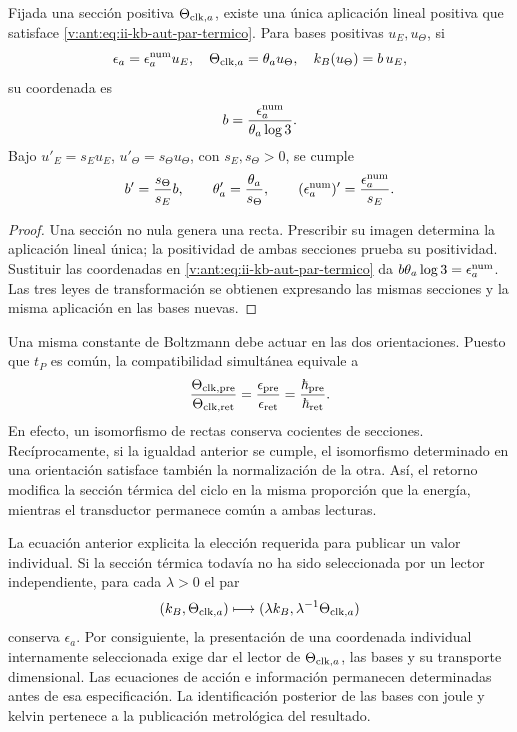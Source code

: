 \begin{theorem}
Fijada una sección positiva \(\Theta_{{\rm clk},a}\), existe una
única aplicación lineal positiva que satisface
\eqref{v:ant:eq:ii-kb-aut-par-termico}. Para bases positivas \(u_E,u_\Theta\),
si
\[
 \epsilon_a=\epsilon_a^{\rm num}u_E,\quad
 \Theta_{{\rm clk},a}=\theta_a u_\Theta,\quad
 k_B(u_\Theta)=b\,u_E,
\]
su coordenada es
\begin{equation}
 b=\frac{\epsilon_a^{\rm num}}{\theta_a\log3}.
 \label{v:ant:eq:ii-kb-aut-coordenada}
\end{equation}
Bajo \(u'_E=s_Eu_E\), \(u'_\Theta=s_\Theta u_\Theta\), con
\(s_E,s_\Theta>0\), se cumple
\[
 b'=\frac{s_\Theta}{s_E}b,\qquad
 \theta'_a=\frac{\theta_a}{s_\Theta},\qquad
 (\epsilon_a^{\rm num})'=\frac{\epsilon_a^{\rm num}}{s_E}.
\]
\end{theorem}
\begin{proof}
Una sección no nula genera una recta. Prescribir su imagen determina
la aplicación lineal única; la positividad de ambas secciones prueba
su positividad. Sustituir las coordenadas en
\eqref{v:ant:eq:ii-kb-aut-par-termico} da
\(b\theta_a\log3=\epsilon_a^{\rm num}\). Las tres leyes de
transformación se obtienen expresando las mismas secciones y la misma
aplicación en las bases nuevas.
\end{proof}

Una misma constante de Boltzmann debe actuar en las dos orientaciones.
Puesto que \(t_P\) es común, la compatibilidad simultánea equivale a
\begin{equation}
 \frac{\Theta_{{\rm clk},{\rm pre}}}{\Theta_{{\rm clk},{\rm ret}}}
 =\frac{\epsilon_{\rm pre}}{\epsilon_{\rm ret}}
 =\frac{\hbar_{\rm pre}}{\hbar_{\rm ret}}.
 \label{v:ant:eq:ii-kb-aut-orientaciones}
\end{equation}
En efecto, un isomorfismo de rectas conserva cocientes de secciones.
Recíprocamente, si la igualdad anterior se cumple, el isomorfismo
determinado en una orientación satisface también la normalización de
la otra. Así, el retorno modifica la sección térmica del ciclo en la
misma proporción que la energía, mientras el transductor permanece
común a ambas lecturas.

La ecuación anterior explicita la elección requerida para publicar un
valor individual. Si la sección térmica todavía no ha sido seleccionada
por un lector independiente, para cada \(\lambda>0\) el par
\[
 (k_B,\Theta_{{\rm clk},a})
 \longmapsto(\lambda k_B,\lambda^{-1}\Theta_{{\rm clk},a})
\]
conserva \(\epsilon_a\). Por consiguiente, la presentación de una
coordenada individual internamente seleccionada exige dar el lector de
\(\Theta_{{\rm clk},a}\), las bases y su transporte dimensional.
Las ecuaciones de acción e información permanecen determinadas antes
de esa especificación. La identificación posterior de las bases con
joule y kelvin pertenece a la publicación metrológica del resultado.

